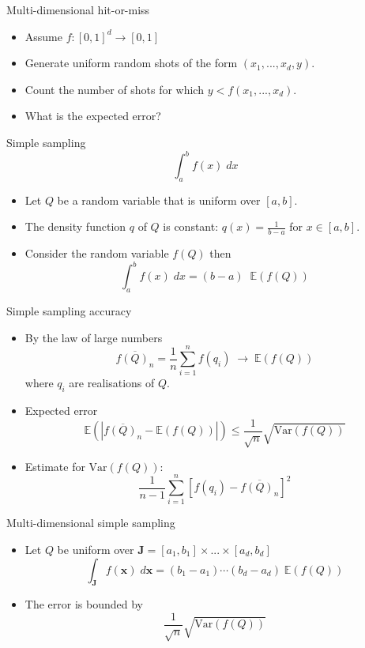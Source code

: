 \documentclass[10pt]{beamer}
\renewcommand{\vec}[1]{\mathbf{#1}}
\begin{document}
\begin{frame}[label={sec:org2e372ab}]{Multi-dimensional hit-or-miss}
\begin{itemize}
\item Assume \(f:[0,1]^d \to [0,1]\)
\item Generate uniform random \alert{shots} of the form \((x_1,...,x_d,y)\).
\item Count the number of shots for which \(y < f(x_1,...,x_d)\).
\item What is the expected error?
\end{itemize}
\end{frame}
\begin{frame}[label={sec:orgadbe8cb}]{Simple sampling}
$$\int_{a}^{b} f(x)\; dx$$

\begin{itemize}
\item Let \(Q\) be a random variable that is \alert{uniform} over \([a,b]\).

\item The density function \(q\) of \(Q\) is constant: \(q(x) = \frac{1}{b-a}\) for \(x\in[a,b]\).

\item Consider the random variable \(f(Q)\) then
$$\int_a^b f(x) \; dx = (b-a) \;\; \mathbb{E}\left( f(Q) \right)$$
\end{itemize}
\end{frame}

\begin{frame}[label={sec:org17dc90d}]{Simple sampling accuracy}
\begin{itemize}
\item By the law of large numbers
$$\overline{f(Q)_n} = \frac{1}{n} \sum_{i=1}^n f(q_i) \; \to \; \mathbb{E}(f(Q))$$
where \(q_i\) are realisations of \(Q\).
\item Expected error
$$\mathbb{E}\left( \left\vert \overline{f(Q)_n} - \mathbb{E}(f(Q)) \right\vert \right) \leq \frac{1}{\sqrt{n}} \sqrt{\mathrm{Var}(f(Q))}$$
\item Estimate for \(\mathrm{Var}(f(Q))\):
$$\frac{1}{n-1}\sum_{i=1}^n \left[ f(q_i) - \overline{f(Q)_n} \right]^2$$
\end{itemize}
\end{frame}
\begin{frame}[label={sec:org33f5491}]{Multi-dimensional simple sampling}
\begin{itemize}
\item Let \(Q\) be uniform over \(\mathbf{J} = [a_1,b_1]\times...\times[a_d,b_d]\)
$$\int_{\mathbf{J}} f(\vec{x}) \; d\vec{x} = (b_1-a_1)\cdots(b_d-a_d)\;\mathbb{E}(f(Q))$$
\item The error is bounded by
$$\frac{1}{\sqrt{n}}\sqrt{\mathrm{Var}(f(Q))}$$
\end{itemize}
\end{frame}
\end{document}
